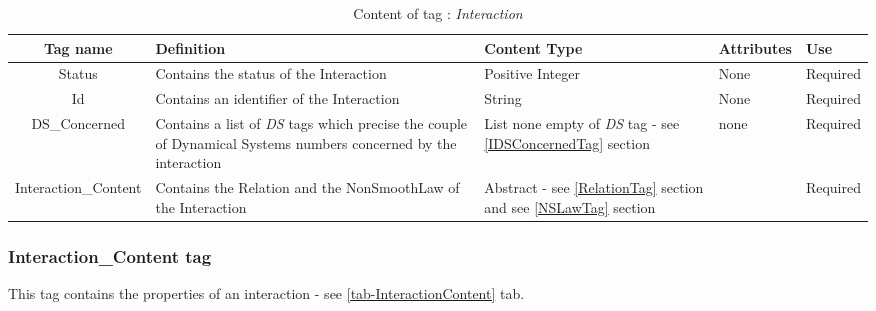 \begin{table}[!hbp]
\begin{center}
\begin{tabular}{|c|p{5cm}|p{2cm}|p{2.5cm}|p{2cm}|}
\hline
\bf{Tag name} & \bf{Definition} & \bf{Content Type} & \bf{Attributes} & \bf{Use}
\\\hline
\hline
Status		  & Contains the status of the Interaction & Positive Integer & None &  Required \\
\hline
Id		  & Contains an identifier of the Interaction & String & None &  Required \\
\hline
DS\_Concerned	  & Contains a list of \textit{DS} tags which precise the couple of Dynamical Systems numbers concerned by the interaction & List none empty of \textit{DS} tag - see \ref{IDSConcernedTag} section & none &  Required \\
\hline
Interaction\_Content& Contains the Relation and the NonSmoothLaw of the Interaction & Abstract - see \ref{RelationTag} section and see \ref{NSLawTag} section & &  Required \\
\hline
\end{tabular}
\end{center}
\caption{Content of tag : \textit{Interaction}}
\label{tab-Interaction}
\end{table}

\subsubsection{Interaction\_Content tag}
\label{InteractionContentTag}
This tag contains the properties of an interaction - see \ref{tab-InteractionContent} tab.\\

